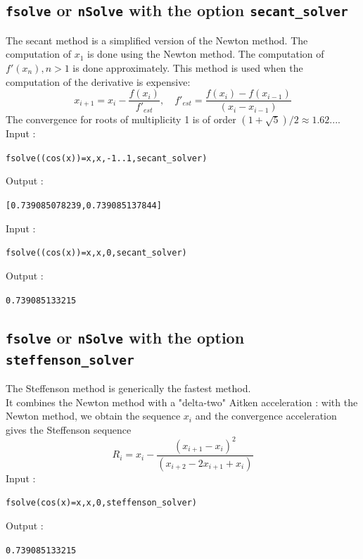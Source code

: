 \documentclass[a4paper,11pt]{book}
\begin{document}
\subsection{{\tt fsolve} or {\tt nSolve} with the option {\tt secant\_solver}}
The secant method is a simplified version of the Newton method.
The computation of $x_1$ is done using the Newton method.
The computation of $f'(x_n), n>1$ is done approximately. 
This method is used when the 
computation of the derivative is expensive:
\[ x_{i+1} = x_i-\frac{ f(x_i)}{f'_{est}}, \quad 
f'_{est} = \frac{f(x_i) - f(x_{i-1})}{(x_i - x_{i-1})}
\]
The convergence for roots of multiplicity 1
is of order $(1 + \sqrt5)/2 \approx 1.62... $.\\
Input :
\begin{center}{\tt fsolve((cos(x))=x,x,-1..1,secant\_solver)}\end{center}
Output :
\begin{center}{\tt [0.739085078239,0.739085137844]}\end{center}
Input :
\begin{center}{\tt fsolve((cos(x))=x,x,0,secant\_solver)}\end{center}
Output :
\begin{center}{\tt 0.739085133215}\end{center}

\subsection{{\tt fsolve} or {\tt nSolve} with the option {\tt steffenson\_solver}}
The Steffenson method is generically the fastest method.\\
It combines the Newton method with a "delta-two" Aitken acceleration : 
with the Newton method, we obtain the sequence $x_i$ and the convergence
acceleration gives the Steffenson sequence 
\[ R_i =x_i - \frac{(x_{i+1} - x_i)^2}{ (x_{i+2} - 2 x_{i+1} + x_{i})} \]
Input :
\begin{center}{\tt fsolve(cos(x)=x,x,0,steffenson\_solver)}\end{center}
Output :
\begin{center}{\tt  0.739085133215}\end{center}
\end{document}
